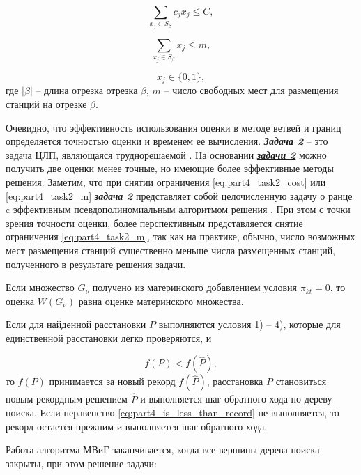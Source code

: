 \begin{equation}\label{eq:part4_task2_cost}
    \sum\limits_{x_j \in S_\beta} c_j x_j \leqslant C,
\end{equation}

\begin{equation}\label{eq:part4_task2_m}
    \sum\limits_{x_j \in S_\beta} x_j \leqslant m,
\end{equation}

\begin{displaymath}
    x_j \in \{0, 1\},
\end{displaymath}
где $|\beta|$ -- длина отрезка отрезка  $\beta$, $m$ -- число свободных мест для размещения станций на отрезке $\beta$.

Очевидно, что эффективность использования оценки в методе ветвей и границ определяется точностью оценки и временем ее вычисления. \underline{\textit{\textbf{Задача 2}}} -- это задача ЦЛП, являющаяся труднорешаемой \cite{Gari}. На основании \underline{\textit{\textbf{задачи 2}}} можно получить две оценки менее точные, но имеющие более эффективные методы решения. Заметим, что при снятии ограничения \cref{eq:part4_task2_cost} или \cref{eq:part4_task2_m} \underline{\textit{\textbf{задача 2}}} представляет собой целочисленную задачу о ранце c эффективным псевдополиномиальным алгоритмом решения \cite{Gari}. При этом с точки зрения точности оценки, более перспективным представляется снятие ограничения \cref{eq:part4_task2_m}, так как на практике, обычно, число возможных мест размещения станций существенно меньше числа размещенных станций, полученного в результате решения задачи. 

Если множество $G_\nu$ получено из материнского добавлением условия $\pi_{kt}=0$, то оценка $W(G_\nu)$ равна оценке материнского множества.

Если для найденной расстановки $P$ выполняются условия 1) – 4), которые для единственной расстановки легко проверяются, и

\begin{equation}
    \label{eq:part4_is_less_than_record}
    f(P) < f(\widehat{P}),
\end{equation}
то $f(P)$ принимается за новый рекорд $f(\widehat{P})$, расстановка $P$ становиться новым рекордным решением $\widehat{P}$ и выполняется шаг обратного хода по дереву поиска. Если неравенство \cref{eq:part4_is_less_than_record} не выполняется, то рекорд остается прежним и выполняется шаг обратного хода.

Работа алгоритма МВиГ заканчивается, когда все вершины дерева поиска закрыты, при этом решение задачи: 

